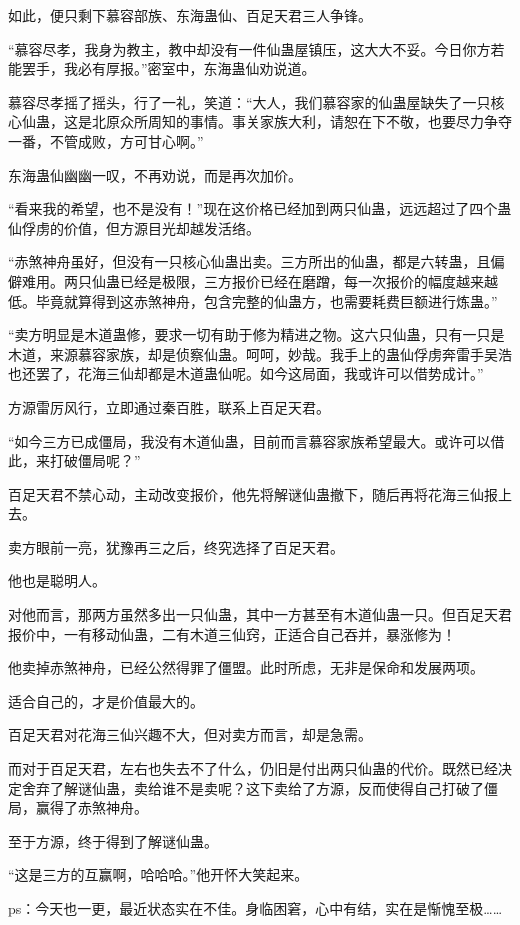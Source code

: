 \begin{this_body}
如此，便只剩下慕容部族、东海蛊仙、百足天君三人争锋。

“慕容尽孝，我身为教主，教中却没有一件仙蛊屋镇压，这大大不妥。今日你方若能罢手，我必有厚报。”密室中，东海蛊仙劝说道。

慕容尽孝摇了摇头，行了一礼，笑道：“大人，我们慕容家的仙蛊屋缺失了一只核心仙蛊，这是北原众所周知的事情。事关家族大利，请恕在下不敬，也要尽力争夺一番，不管成败，方可甘心啊。”

东海蛊仙幽幽一叹，不再劝说，而是再次加价。

“看来我的希望，也不是没有！”现在这价格已经加到两只仙蛊，远远超过了四个蛊仙俘虏的价值，但方源目光却越发活络。

“赤煞神舟虽好，但没有一只核心仙蛊出卖。三方所出的仙蛊，都是六转蛊，且偏僻难用。两只仙蛊已经是极限，三方报价已经在磨蹭，每一次报价的幅度越来越低。毕竟就算得到这赤煞神舟，包含完整的仙蛊方，也需要耗费巨额进行炼蛊。”

“卖方明显是木道蛊修，要求一切有助于修为精进之物。这六只仙蛊，只有一只是木道，来源慕容家族，却是侦察仙蛊。呵呵，妙哉。我手上的蛊仙俘虏奔雷手吴浩也还罢了，花海三仙却都是木道蛊仙呢。如今这局面，我或许可以借势成计。”

方源雷厉风行，立即通过秦百胜，联系上百足天君。

“如今三方已成僵局，我没有木道仙蛊，目前而言慕容家族希望最大。或许可以借此，来打破僵局呢？”

百足天君不禁心动，主动改变报价，他先将解谜仙蛊撤下，随后再将花海三仙报上去。

卖方眼前一亮，犹豫再三之后，终究选择了百足天君。

他也是聪明人。

对他而言，那两方虽然多出一只仙蛊，其中一方甚至有木道仙蛊一只。但百足天君报价中，一有移动仙蛊，二有木道三仙窍，正适合自己吞并，暴涨修为！

他卖掉赤煞神舟，已经公然得罪了僵盟。此时所虑，无非是保命和发展两项。

适合自己的，才是价值最大的。

百足天君对花海三仙兴趣不大，但对卖方而言，却是急需。

而对于百足天君，左右也失去不了什么，仍旧是付出两只仙蛊的代价。既然已经决定舍弃了解谜仙蛊，卖给谁不是卖呢？这下卖给了方源，反而使得自己打破了僵局，赢得了赤煞神舟。

至于方源，终于得到了解谜仙蛊。

“这是三方的互赢啊，哈哈哈。”他开怀大笑起来。

ps：今天也一更，最近状态实在不佳。身临困窘，心中有结，实在是惭愧至极……

\end{this_body}

